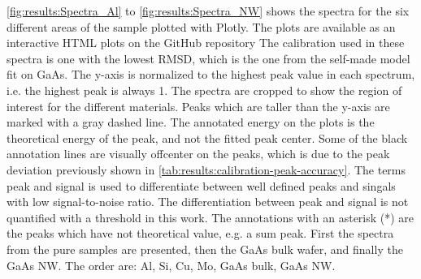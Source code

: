 \cref{fig:results:Spectra_Al} to \cref{fig:results:Spectra_NW} shows the spectra for the six different areas of the sample plotted with Plotly.
The plots are available as an interactive HTML plots on the GitHub repository
The calibration used in these spectra is one with the lowest RMSD, which is the one from the self-made model fit on GaAs.
The y-axis is normalized to the highest peak value in each spectrum, i.e. the highest peak is always 1. %
The spectra are cropped to show the region of interest for the different materials.
Peaks which are taller than the y-axis are marked with a gray dashed line.
The annotated energy on the plots is the theoretical energy of the peak, and not the fitted peak center.
Some of the black annotation lines are visually offcenter on the peaks, which is due to the peak deviation previously shown in \cref{tab:results:calibration-peak-accuracy}.
The terms peak and signal is used to differentiate between well defined peaks and singals with low signal-to-noise ratio.
The differentiation between peak and signal is not quantified with a threshold in this work. %
The annotations with an asterisk (*) are the peaks which have not theoretical value, e.g. a sum peak.
First the spectra from the pure samples are presented, then the GaAs bulk wafer, and finally the GaAs NW.
The order are: Al, Si, Cu, Mo, GaAs bulk, GaAs NW.




